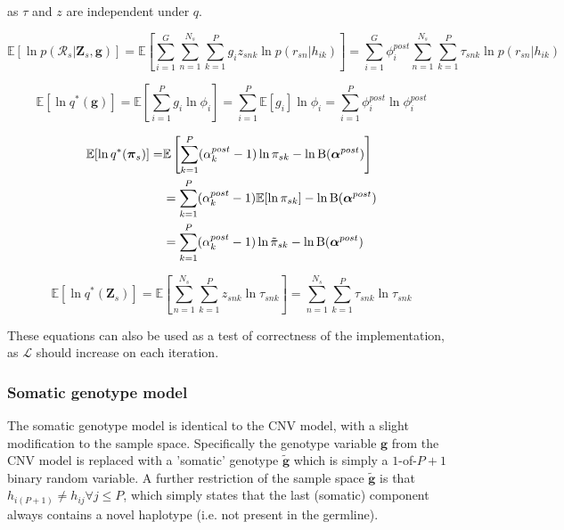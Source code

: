 \documentclass{article}
\begin{document}
as $\tau$ and $z$ are independent under $q$.

\begin{equation}
\mathbb{E}[\ln p(\mathcal{R}_s | \boldsymbol{Z}_s, \boldsymbol{g})] = \mathbb{E}\left[ \sum_{i = 1}^G \sum_{n = 1}^{N_s} \sum_{k = 1}^P g_i z_{snk} \ln p(r_{sn} | h_{ik}) \right] = \sum_{i = 1}^G \phi_i^{post} \sum_{n = 1}^{N_s} \sum_{k = 1}^P \tau_{snk} \ln p(r_{sn} | h_{ik})
\end{equation}

\begin{equation}
\mathbb{E}[\ln q^*(\boldsymbol{g})] = \mathbb{E}\left[\sum_{i = 1}^P g_i \ln \phi_i\right] = \sum_{i = 1}^P \mathbb{E}[g_i] \ln \phi_i = \sum_{i = 1}^P \phi_i^{post} \ln \phi_i^{post}
\end{equation}

\begin{align}
\mathbb{E}[\ln q^*(\boldsymbol{\pi}_s)] =& \mathbb{E}\left[\sum_{k = 1}^P (\alpha_k^{post} - 1) \ln \pi_{sk} - \ln \text{B}(\boldsymbol{\alpha}^{post})\right] \notag \\ 
&= \sum_{k = 1}^P (\alpha_k^{post} - 1) \mathbb{E} [\ln \pi_{sk}] - \ln \text{B}(\boldsymbol{\alpha}^{post}) \notag \\
 &= \sum_{k = 1}^P (\alpha_k^{post} - 1) \ln \tilde{\pi}_{sk} - \ln \text{B}(\boldsymbol{\alpha}^{post})
\end{align}

\begin{equation}
\mathbb{E}[\ln q^*(\boldsymbol{Z}_s)] = \mathbb{E}\left[\sum_{n = 1}^{N_s} \sum_{k = 1}^P z_{snk} \ln \tau_{snk} \right] = \sum_{n = 1}^{N_s} \sum_{k = 1}^P \tau_{snk} \ln \tau_{snk}
\end{equation}

These equations can also be used as a test of correctness of the implementation, as $\mathcal{L}$ should increase on each iteration.

\subsubsection{Somatic genotype model}

The somatic genotype model is identical to the CNV model, with a slight modification to the sample space. Specifically the genotype variable $\boldsymbol{g}$ from the CNV model is replaced with a 'somatic' genotype $\tilde{\boldsymbol{g}}$ which is simply a $1$-of-$P + 1$ binary random variable. A further restriction of the sample space $\tilde{\boldsymbol{g}}$ is that $h_{i(P + 1)} \ne h_{ij} \forall j \le P$, which simply states that the last (somatic) component always contains a novel haplotype (i.e. not present in the germline).
\end{document}
